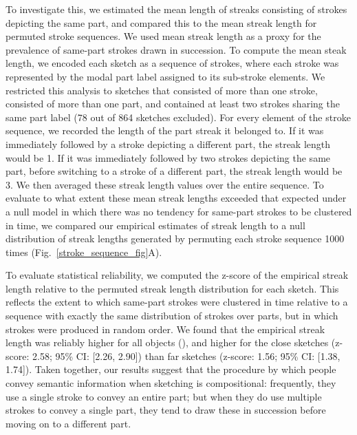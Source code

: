 \documentclass[10pt,letterpaper]{article}
\newcommand{\jefan}[1]{{\color{blue}{[jefan: #1]}}}
\begin{document}
To investigate this, we estimated the mean length of streaks consisting of strokes depicting the same part, and compared this to the mean streak length for permuted stroke sequences. 
We used mean streak length as a proxy for the prevalence of same-part strokes drawn in succession. 
To compute the mean steak length, we encoded each sketch as a sequence of strokes, where each stroke was represented by the modal part label assigned to its sub-stroke elements. 
We restricted this analysis to sketches that consisted of more than one stroke, consisted of more than one part, and contained at least two strokes sharing the same part label (78 out of 864 sketches excluded). 
For every element of the stroke sequence, we recorded the length of the part streak it belonged to. 
If it was immediately followed by a stroke depicting a different part, the streak length would be 1. 
If it was immediately followed by two strokes depicting the same part, before switching to a stroke of a different part, the streak length would be 3. 
We then averaged these streak length values over the entire sequence. 
To evaluate to what extent these mean streak lengths exceeded that expected under a null model in which there was no tendency for same-part strokes to be clustered in time, we compared our empirical estimates of streak length to a null distribution of streak lengths generated by permuting each stroke sequence 1000 times (Fig.~\ref{stroke_sequence_fig}A). 

To evaluate statistical reliability, we computed the z-score of the empirical streak length relative to the permuted streak length distribution for each sketch. 
This reflects the extent to which same-part strokes were clustered in time relative to a sequence with exactly the same distribution of strokes over parts, but in which strokes were produced in random order. 
We found that the empirical streak length was reliably higher for all objects (\jefan{we need a stat for this, like a p-value reflecting the number of times the permuted streak length exceeded the empirical. If this never happened, then we can say ps < 0.001.}), and higher for the close sketches (z-score: 2.58; 95\% CI: [2.26, 2.90]) than far sketches (z-score: 1.56; 95\% CI: [1.38, 1.74]).
Taken together, our results suggest that the procedure by which people convey semantic information when sketching is compositional: frequently, they use a single stroke to convey an entire part; but when they do use multiple strokes to convey a single part, they tend to draw these in succession before moving on to a different part. 
\end{document}
